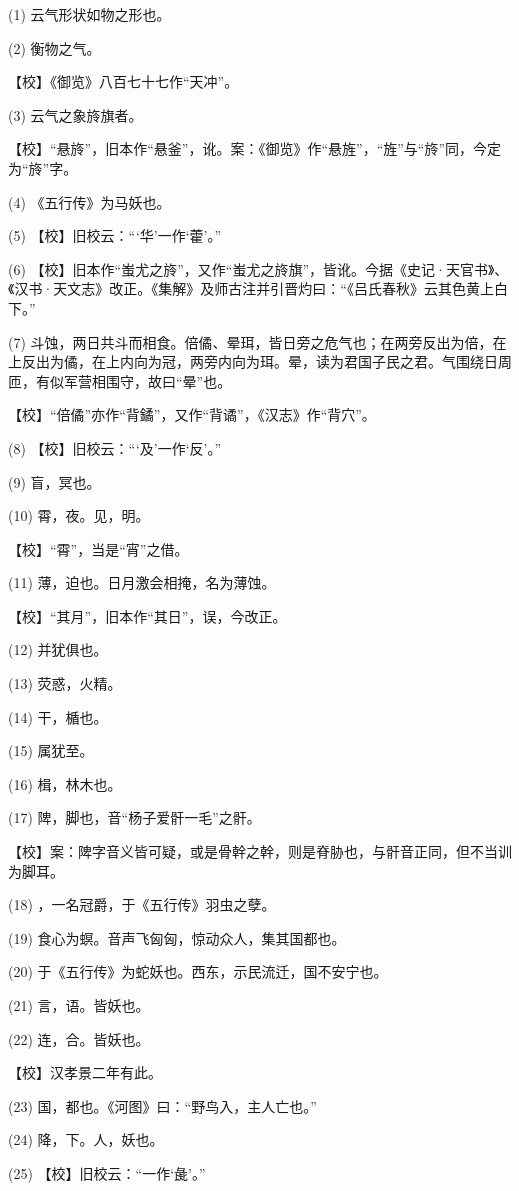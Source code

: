 \documentclass[12pt,UTF8]{ctexbook}
\begin{document}
(1) 云气形状如物之形也。

(2) 衡物之气。

【校】《御览》八百七十七作“天冲”。

(3) 云气之象旍旗者。

【校】“悬旍”，旧本作“悬釜”，讹。案：《御览》作“悬旌”，“旌”与“旍”同，今定为“旍”字。

(4) 《五行传》为马妖也。

(5) 【校】旧校云：“‘华’一作‘藿’。”

(6) 【校】旧本作“蚩尤之旍”，又作“蚩尤之旍旗”，皆讹。今据《史记·天官书》、《汉书·天文志》改正。《集解》及师古注并引晋灼曰：“《吕氏春秋》云其色黄上白下。”

(7) 斗蚀，两日共斗而相食。倍僪、晕珥，皆日旁之危气也；在两旁反出为倍，在上反出为僪，在上内向为冠，两旁内向为珥。晕，读为君国子民之君。气围绕日周匝，有似军营相围守，故曰“晕”也。

【校】“倍僪”亦作“背鐍”，又作“背谲”，《汉志》作“背穴”。

(8) 【校】旧校云：“‘及’一作‘反’。”

(9) 盲，冥也。

(10) 霄，夜。见，明。

【校】“霄”，当是“宵”之借。

(11) 薄，迫也。日月激会相掩，名为薄蚀。

【校】“其月”，旧本作“其日”，误，今改正。

(12) 并犹俱也。

(13) 荧惑，火精。

(14) 干，楯也。

(15) 属犹至。

(16) 楫，林木也。

(17) 陴，脚也，音“杨子爱骭一毛”之骭。

【校】案：陴字音义皆可疑，或是骨幹之幹，则是脊胁也，与骭音正同，但不当训为脚耳。

(18) ，一名冠爵，于《五行传》羽虫之孽。

(19) 食心为螟。音声飞匈匈，惊动众人，集其国都也。

(20) 于《五行传》为蛇妖也。西东，示民流迁，国不安宁也。

(21) 言，语。皆妖也。

(22) 连，合。皆妖也。

【校】汉孝景二年有此。

(23) 国，都也。《河图》曰：“野鸟入，主人亡也。”

(24) 降，下。人，妖也。

(25) 【校】旧校云：“一作‘彘’。”
\end{document}
